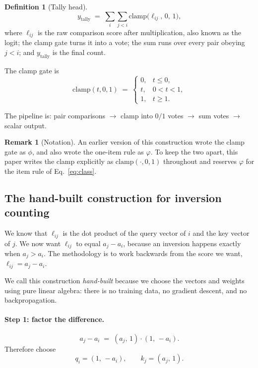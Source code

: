 \documentclass[10pt]{article}
\theoremstyle{definition}
\newtheorem{definition}{Definition}
\newtheorem{remark}{Remark}
\newcommand{\clampf}{\mathrm{clamp}}
\begin{document}
\begin{definition}[Tally head]
\label{def:tally}
\begin{equation}
y_{\text{tally}} \;=\; \sum_i \sum_{j<i} \clampf\big(\ell_{ij},\, 0,\, 1\big),
\label{eq:tally}
\end{equation}
where $\ell_{ij}$ is the raw comparison score after multiplication, also
known as the logit; the clamp gate turns it into a vote; the sum runs over
every pair obeying $j < i$; and $y_{\text{tally}}$ is the final count.
\end{definition}

The clamp gate is
\begin{equation}
\clampf(t, 0, 1) \;=\;
\begin{cases}
0, & t \leq 0,\\
t, & 0 < t < 1,\\
1, & t \geq 1.
\end{cases}
\label{eq:clamp}
\end{equation}

The pipeline is: pair comparisons $\rightarrow$ clamp into $0/1$ votes
$\rightarrow$ sum votes $\rightarrow$ scalar output.

\begin{remark}[Notation]
\label{rem:phi-collision}
An earlier version of this construction wrote the clamp gate as $\phi$, and also wrote the
one-item rule as $\varphi$. To keep the two apart, this paper writes the
clamp explicitly as $\clampf(\cdot, 0, 1)$ throughout and reserves
$\varphi$ for the item rule of Eq.~\eqref{eq:class}.
\end{remark}

\subsection{The hand-built construction for inversion counting}
\label{sec:handbuilt}

We know that $\ell_{ij}$ is the dot product of the query vector of $i$ and
the key vector of $j$. We now want $\ell_{ij}$ to equal $a_j - a_i$,
because an inversion happens exactly when $a_j > a_i$. The methodology is
to work backwards from the score we want, $\ell_{ij} = a_j - a_i$.

We call this construction \emph{hand-built} because we choose the vectors
and weights using pure linear algebra: there is no training data, no
gradient descent, and no backpropagation.

\paragraph{Step 1: factor the difference.}
\[
a_j - a_i \;=\; (a_j,\, 1) \cdot (1,\, -a_i).
\]
Therefore choose
\begin{equation}
q_i = (1,\, -a_i), \qquad k_j = (a_j,\, 1).
\label{eq:qk-inv}
\end{equation}
\end{document}

